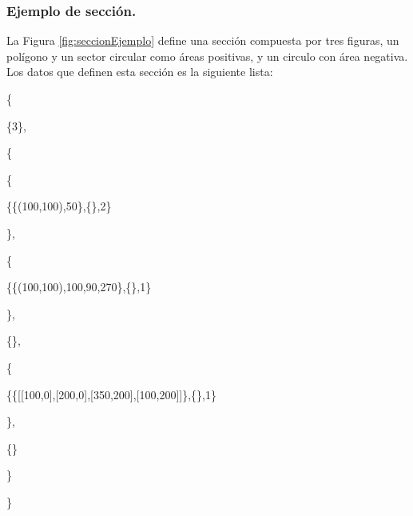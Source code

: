 \documentclass[spanish,xcolor=pdftex,dvipsnames,table,mathserif]{scrartcl}
\begin{document}
\subsubsection{Ejemplo de sección.}
La Figura \ref{fig:seccionEjemplo} define una sección compuesta por tres figuras, un polígono y un sector circular como áreas positivas, y un circulo con área negativa. Los datos que definen esta sección es la siguiente lista:

\{

\hspace{0.5cm}\{3\},

\hspace{0.5cm}\{

\hspace{1cm}\{

\hspace{1.5cm}\{\{(100,100),50\},\{\},2\}

\hspace{1cm}\},

\hspace{1cm}\{

\hspace{1.5cm}\{\{(100,100),100,90,270\},\{\},1\}

\hspace{1cm}\},

\hspace{1cm}\{\},

\hspace{1cm}\{

\hspace{1.5cm}\{\{[[100,0],[200,0],[350,200],[100,200]]\},\{\},1\}

\hspace{1cm}\},

\hspace{1cm}\{\}

\hspace{0.5cm}\}

\}
\end{document}
